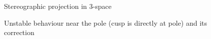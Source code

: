 \documentclass[11pt]{article}
\begin{document}
\begin{figure}[ht]
\begin{center}
\end{center}
\caption{Stereographic projection in 3-space}
\label{fig:stereo}
\end{figure}

\begin{figure}[h]
\vspace{3in}
\caption{Unstable behaviour near the pole (cusp is directly at pole) and its correction}
\label{fig:wild}
\end{figure}
\end{document}
